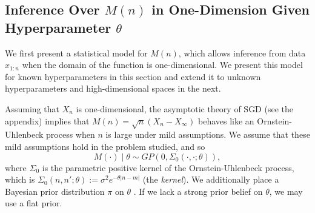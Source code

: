 \documentclass[12pt,english]{article}
\newcommand{\pfcomment}[1]{{\color{red} PF: #1}}
\newcommand{\stedit}[1]{{\color{blue} #1}}
\begin{document}


\subsection{Inference Over $M(n)$ in One-Dimension Given Hyperparameter $\theta$}
\label{sec:SGD-GP-1}

\stedit{We first present a statistical model for $M(n)$, which allows inference from data  $x_{1:n}$ when the domain of the function is one-dimensional. We present this model for known hyperparameters in this section and extend it to unknown hyperparameters  and high-dimensional spaces in the next.}

Assuming that $X_{n}$ is one-dimensional, the asymptotic theory of SGD  (see the appendix) implies that 
$M(n)=\sqrt{n}\left(X_{n}-X_{\infty}\right)$ behaves like an Ornstein-Uhlenbeck process when $n$ is large under mild assumptions.
We assume that these mild assumptions hold in the problem studied, and so 
\[
M(\cdot) \mid \theta\sim GP\left(0,\Sigma_{0}\left(\cdot,\cdot; \theta\right)\right),
\]
where $\Sigma_{0}$ is the parametric positive kernel of the Ornstein-Uhlenbeck process, which is $\Sigma_{0}(n,n';\theta):=\sigma^{2}e^{-\theta\left|n-m\right|}$ (the {\it kernel}). 
We additionally place a Bayesian prior distribution $\pi$ on $\theta$ \citep{Neal:GPBayesian}. If we lack a strong prior belief on $\theta$, we may use a flat prior.
\end{document}
